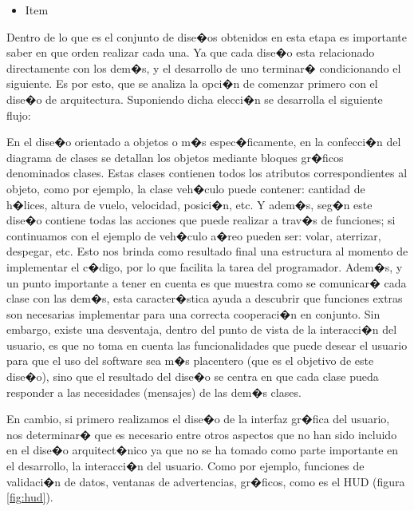 \begin{itemize}
\item Item 
\end{itemize}


\par Dentro de lo que es el conjunto de dise�os obtenidos en esta etapa es importante saber en que orden realizar cada una. Ya que cada dise�o esta relacionado directamente con los dem�s, y el desarrollo de uno terminar� condicionando el siguiente. Es por esto, que se analiza la opci�n de comenzar primero con el dise�o de arquitectura. Suponiendo dicha elecci�n se desarrolla el siguiente flujo:

\par En el dise�o orientado a objetos o m�s espec�ficamente, en la confecci�n del diagrama de clases se detallan los objetos mediante bloques gr�ficos denominados clases. Estas clases contienen todos los atributos correspondientes al objeto, como por ejemplo, la clase veh�culo puede contener: cantidad de h�lices, altura de vuelo, velocidad, posici�n, etc. Y adem�s, seg�n este dise�o contiene todas las acciones que puede realizar a trav�s de funciones; si continuamos con el ejemplo de veh�culo a�reo pueden ser: volar, aterrizar, despegar, etc. Esto nos brinda como resultado final una estructura al momento de implementar el c�digo, por lo que facilita la tarea del programador. Adem�s, y un punto importante a tener en cuenta es que muestra como se comunicar� cada clase con las dem�s, esta caracter�stica ayuda a descubrir que funciones extras son necesarias implementar para una correcta cooperaci�n en conjunto. Sin embargo, existe una desventaja, dentro del punto de vista de la interacci�n del usuario, es que no toma en cuenta las funcionalidades que puede desear el usuario para que el uso del software sea m�s placentero (que es el objetivo de este dise�o), sino que el resultado del dise�o se centra en que cada clase pueda responder a las necesidades (mensajes) de las dem�s clases. 


En cambio, si primero realizamos el dise�o de la interfaz gr�fica del usuario, nos determinar� que es necesario entre otros aspectos que no han sido incluido en el dise�o arquitect�nico ya que no se ha tomado como parte importante en el desarrollo, la interacci�n del usuario. Como por ejemplo, funciones de validaci�n de datos, ventanas de advertencias, gr�ficos, como es el HUD (figura \ref{fig:hud}).


